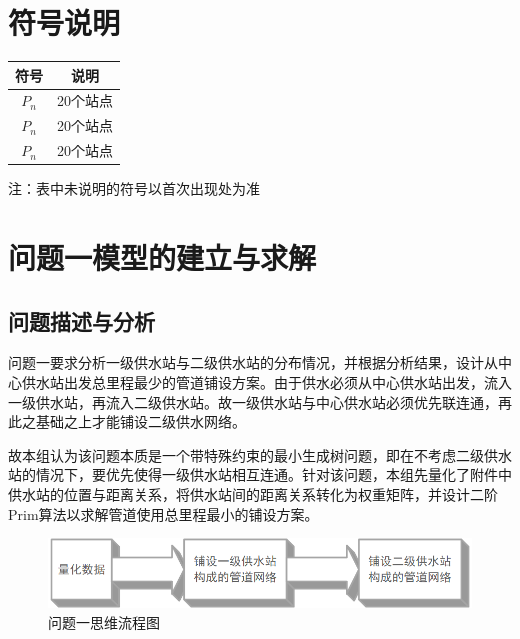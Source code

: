 \documentclass{whutmod}
\begin{document}
		
	\section{符号说明}
		\begin{table}[H]
		\centering
		\setlength{\tabcolsep}{12mm}
		\begin{tabular}{cc}
			\toprule[1.5pt]
			\multicolumn{1}{m{5cm}}{\centering 符号} & \multicolumn{1}{m{5cm}}{\centering 说明} \\
			\midrule[1pt]		
			$P_n$  & 20个站点  \\ 
			$P_n$  & 20个站点  \\ 
		   	$P_n$  & 20个站点  \\ 
			\bottomrule[1.5pt]
		\end{tabular}
		\begin{tablenotes}
		\item 注：表中未说明的符号以首次出现处为准
		\end{tablenotes}
		\end{table}

	\section{问题一模型的建立与求解}
		\subsection{问题描述与分析}
			问题一要求分析一级供水站与二级供水站的分布情况，并根据分析结果，设计从中心供水站出发总里程最少的管道铺设方案。由于供水必须从中心供水站出发，流入一级供水站，再流入二级供水站。故一级供水站与中心供水站必须优先联连通，再此之基础之上才能铺设二级供水网络。
			
			故本组认为该问题本质是一个带特殊约束的最小生成树问题，即在不考虑二级供水站的情况下，要优先使得一级供水站相互连通。针对该问题，本组先量化了附件中供水站的位置与距离关系，将供水站间的距离关系转化为权重矩阵，并设计二阶Prim算法以求解管道使用总里程最小的铺设方案。
			
		
			\begin{figure}[H]
				\centering
				\includegraphics[width=\textwidth]{figures/51615.png}
				\caption{问题一思维流程图}\label{lct}
			\end{figure}
			
\end{document}
